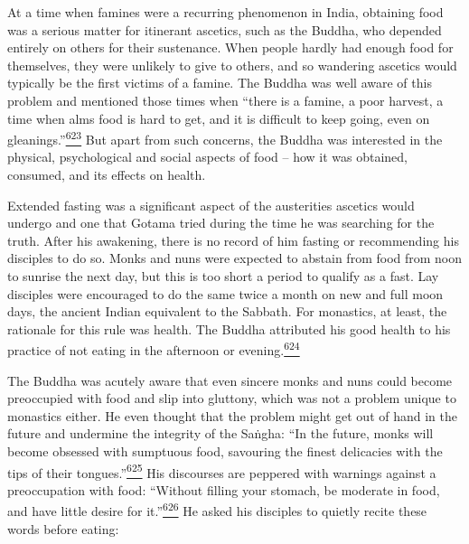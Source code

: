 At a time when famines were a recurring phenomenon in India, obtaining
food was a serious matter for itinerant ascetics, such as the Buddha,
who depended entirely on others for their sustenance. When people hardly
had enough food for themselves, they were unlikely to give to others,
and so wandering ascetics would typically be the first victims of a
famine. The Buddha was well aware of this problem and mentioned those
times when ``there is a famine, a poor harvest, a time when alms food is
hard to get, and it is difficult to keep going, even on
gleanings.''\label{footprints_split_015.html_fnref623}\hyperref[footprints_split_025.htmlux5cux23fn623]{\textsuperscript{623}}
But apart from such concerns, the Buddha was interested in the physical,
psychological and social aspects of food -- how it was obtained,
consumed, and its effects on health.

Extended fasting was a significant aspect of the austerities ascetics
would undergo and one that Gotama tried during the time he was searching
for the truth. After his awakening, there is no record of him fasting or
recommending his disciples to do so. Monks and nuns were expected to
abstain from food from noon to sunrise the next day, but this is too
short a period to qualify as a fast. Lay disciples were encouraged to do
the same twice a month on new and full moon days, the ancient Indian
equivalent to the Sabbath. For monastics, at least, the rationale for
this rule was health. The Buddha attributed his good health to his
practice of not eating in the afternoon or
evening.\label{footprints_split_015.html_fnref624}\hyperref[footprints_split_025.htmlux5cux23fn624]{\textsuperscript{624}}

The Buddha was acutely aware that even sincere monks and nuns could
become preoccupied with food and slip into gluttony, which was not a
problem unique to monastics either. He even thought that the problem
might get out of hand in the future and undermine the integrity of the
Saṅgha: ``In the future, monks will become obsessed with sumptuous food,
savouring the finest delicacies with the tips of their
tongues.''\label{footprints_split_015.html_fnref625}\hyperref[footprints_split_025.htmlux5cux23fn625]{\textsuperscript{625}}
His discourses are peppered with warnings against a preoccupation with
food: ``Without filling your stomach, be moderate in food, and have
little desire for
it.''\label{footprints_split_015.html_fnref626}\hyperref[footprints_split_025.htmlux5cux23fn626]{\textsuperscript{626}}
He asked his disciples to quietly recite these words before eating:

